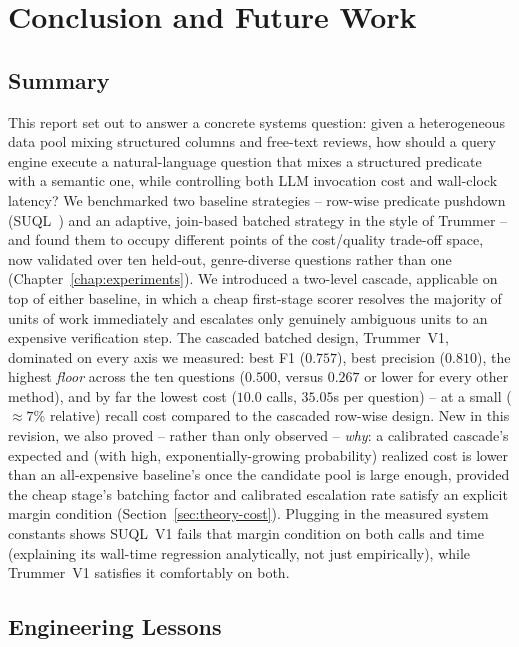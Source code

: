 \chapter{Conclusion and Future Work}
\label{chap:conclusion}

\section{Summary}

This report set out to answer a concrete systems question: given a
heterogeneous data pool mixing structured columns and free-text reviews,
how should a query engine execute a natural-language question that
mixes a structured predicate with a semantic one, while controlling both
LLM invocation cost and wall-clock latency? We benchmarked two baseline
strategies -- row-wise predicate pushdown (SUQL~\cite{suql}) and an
adaptive, join-based batched strategy in the style of Trummer -- and
found them to occupy different points of the cost/quality trade-off
space, now validated over ten held-out, genre-diverse questions rather
than one (Chapter~\ref{chap:experiments}). We introduced a two-level
cascade, applicable on top of either baseline, in which a cheap
first-stage scorer resolves the majority of units of work immediately
and escalates only genuinely ambiguous units to an expensive verification
step. The cascaded batched design, Trummer~V1, dominated on every axis
we measured: best F1 ($0.757$), best precision ($0.810$), the highest
\emph{floor} across the ten questions ($0.500$, versus $0.267$ or lower
for every other method), and by far the lowest cost ($10.0$ calls,
$35.05$s per question) -- at a small ($\approx 7\%$ relative) recall cost
compared to the cascaded row-wise design. New in this revision, we also
proved -- rather than only observed -- \emph{why}: a calibrated cascade's
expected and (with high, exponentially-growing probability) realized
cost is lower than an all-expensive baseline's once the candidate pool
is large enough, provided the cheap stage's batching factor and
calibrated escalation rate satisfy an explicit margin condition
(Section~\ref{sec:theory-cost}). Plugging in the measured system
constants shows SUQL~V1 fails that margin condition on both calls and
time (explaining its wall-time regression analytically, not just
empirically), while Trummer~V1 satisfies it comfortably on both.

\section{Engineering Lessons}

